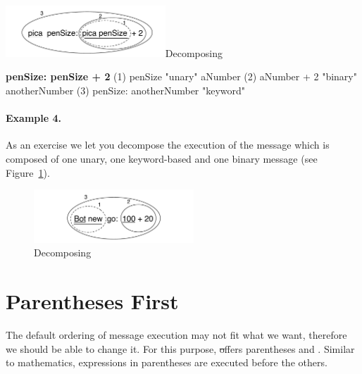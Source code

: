 \begin{decompfigwithsize}[0.65]{\includegraphics[width=6cm]{ukeyUnBin}}{Decomposing }\label{scr:decpen}
   
      \textbf{\caro penSize: \caro penSize + 2}
(1)                          \caro penSize                    "unary"
                          \returns aNumber
(2)                           aNumber + 2	                  "binary"
                           \returns  anotherNumber	
(3)   \caro penSize: anotherNumber                 "keyword"      
\end{decompfigwithsize}




\paragraph{Example 4.} As an exercise we let you decompose the execution of the message  which is composed of one unary, one keyword-based and one binary message (see Figure~\ref{fig:unKeyBin}).

\begin{figure}[h]
\begin{center}
\includegraphics[width=6cm]{uunKeyBin}
\caption{Decomposing }\label{fig:unKeyBin}
\end{center}
\end{figure}

\section*{Parentheses First}
The default ordering of message execution may not fit what we want, therefore we should be able to change it. For this purpose, \st offers parentheses \ct{(} and \ct{)}. Similar to mathematics, expressions in parentheses are executed before the others. 

